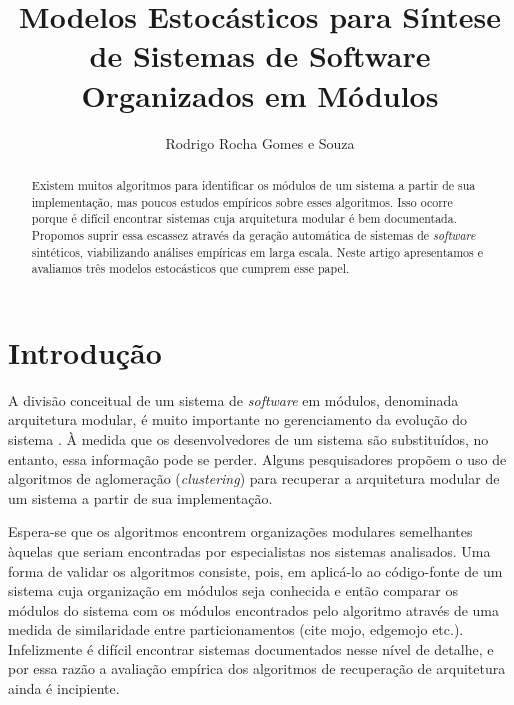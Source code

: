 \documentclass{acm_proc_article-sp}
\begin{document}
\title{Modelos Estocásticos para Síntese de Sistemas de Software Organizados em Módulos}
\author{Rodrigo Rocha Gomes e Souza}
\maketitle

\begin{abstract}

Existem muitos algoritmos para identificar os módulos de um sistema a partir de sua implementação, mas poucos estudos empíricos sobre esses algoritmos. Isso ocorre porque é difícil encontrar sistemas cuja arquitetura modular é bem documentada. Propomos suprir essa escassez através da geração automática de sistemas de \emph{software} sintéticos, viabilizando análises empíricas em larga escala. Neste artigo apresentamos e avaliamos três modelos estocásticos que cumprem esse papel.

\end{abstract}

\section{Introdução} %

A divisão conceitual de um sistema de \emph{software} em módulos, denominada arquitetura modular, é muito importante no gerenciamento da evolução do sistema \cite{Parnas1972}. À medida que os desenvolvedores de um sistema são substituídos, no entanto, essa informação pode se perder. Alguns pesquisadores propõem o uso de algoritmos de aglomeração (\emph{clustering}) para recuperar a arquitetura modular de um sistema a partir de sua implementação. %

Espera-se que os algoritmos encontrem organizações modulares semelhantes àquelas que seriam encontradas por  especialistas nos sistemas analisados. Uma forma de validar os algoritmos consiste, pois, em aplicá-lo ao código-fonte de um sistema cuja organização em módulos seja conhecida e então comparar os módulos do sistema com os módulos encontrados pelo algoritmo através de uma medida de similaridade entre particionamentos (cite mojo, edgemojo etc.). Infelizmente é difícil encontrar sistemas documentados nesse nível de detalhe, e por essa razão a avaliação empírica dos algoritmos de recuperação de arquitetura ainda é incipiente. %

\end{document}
